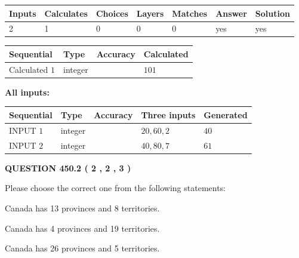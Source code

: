 \documentclass[12pt]{article}
\begin{document}
   
\noindent\begin{tabular}{|l|l|l|l|l|l|l|}
 \hline
Inputs & Calculates & Choices & Layers & Matches & Answer & Solution \\ \hline
 2  & 
 1  & 
 0
  & 
 0  & 
 0  & 
  yes & 
  yes 
  \\ \hline
 \end{tabular}
   
   
   
   
\noindent{}
   
   
  
  
\noindent\begin{tabular}{|l|l|l|l|}
\hline
 Sequential & Type & Accuracy & Calculated \\ 
\hline
 
 
  Calculated $  1 $ & integer &  & 
  $ 101 $ 
 \\  \hline  
 \end{tabular}
   
   
   
   
\noindent\vspace{0.1in}\hspace{-0.08in} {\textbf{\Large{All inputs: }}}
   
   
  
  
\noindent\begin{tabular}{|l|l|l|l|l|}
\hline
 Sequential & Type & Accuracy & Three inputs & Generated \\ 
\hline
 
 
  INPUT $  1 $ & integer &  & $
 20
 , 
 60
 , 
 2
 $ & $ 40 $ 
 \\  \hline  
 
 
  INPUT $  2 $ & integer &  & $
 40
 , 
 80
 , 
 7
 $ & $ 61 $ 
 \\  \hline  
 \end{tabular}
   
   
  
\vspace{0.2in}
  
{\textbf{\Large{QUESTION
450.2 
 ( 2 , 2 , 3 )
}}}
  
  
Please choose the correct one from the following statements:
 
 
Canada has  13 provinces and  8 territories.
 
 
Canada has   4 provinces and  19 territories.
 
 
Canada has  26 provinces and  5 territories.
 
\end{document}

